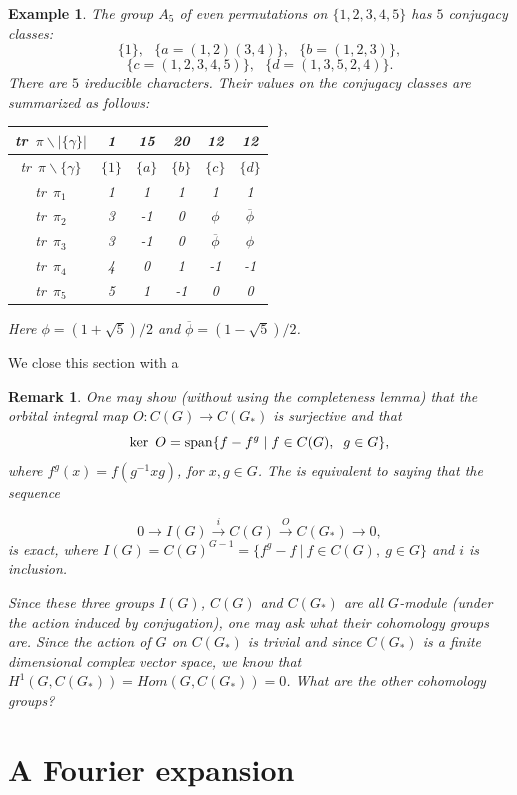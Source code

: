 \documentclass[12pt]{article}
\newtheorem{example}[theorem]{Example}
\newtheorem{remark}{Remark}
\begin{document}
\begin{example}
The group $A_5$ of even permutations on $\{1,2,3,4,5\}$
has $5$ conjugacy classes:
\[
\{1\},\ \ \ \{a=(1,2)(3,4)\},\ \ \ \{b=(1,2,3)\},
\]
\[
\{c=(1,2,3,4,5)\},\ \ \ 
\{d=(1,3,5,2,4)\}.
\]
There are $5$ ireducible characters.
Their values on the conjugacy classes are summarized as follows:
\begin{center}
\begin{tabular}{|c|c|c|c|c|c|} \hline
tr\ $\pi\backslash |\{\gamma\}|$& 1 & 15 & 20 & 12 & 12 \\ \hline
tr\ $\pi\backslash \{\gamma\}$& $\{1\}$ & $\{a \}$ & $\{b \}$ & $\{ c\}$ & $\{ d\}$ \\ \hline
tr\ $\pi _1$ & 1 & 1 & 1 & 1 & 1\\ 
tr\ $\pi _2$ & 3 & -1 & 0 & $\phi$ & $\overline{\phi}$ \\ 
tr\ $\pi _3$ & 3 & -1 & 0 & $\overline{\phi}$ & $\phi$ \\
tr\ $\pi _4$ & 4 & 0 & 1 & -1 & -1 \\ 
tr\ $\pi _5$ & 5 & 1 & -1 & 0 & 0 \\ \hline
\end{tabular}
\end{center}
Here $\phi=(1+\sqrt{5})/2$ and $\overline{\phi}=(1-\sqrt{5})/2$.
\end{example}

We close this section with a

\begin{remark}
One may show (without using the completeness lemma) that the orbital 
integral map $O:C(G)\rightarrow C(G_{*})$ is surjective and that
\[
\ker \medskip\ O=\mathrm{span}\{f-f^g\;|\;f\in C(G),\;\;g\in G\},
\]
where $f^g(x)=f(g^{-1}xg)$, for $x,g\in G$.
The is equivalent to saying that the sequence

\[
0\rightarrow I(G)\stackrel{i}{\rightarrow} C(G)\stackrel{O}{\rightarrow} C(G_*)\rightarrow 0,
\]
is exact, where $I(G)=C(G)^{G-1}=\{f^g-f\ |\ f\in C(G),\ g\in G\}$
and $i$ is inclusion. 

Since these three groups $I(G)$, $C(G)$ and $C(G_*)$ are all $G$-module
(under the action induced by conjugation), one may ask what their
cohomology groups are. Since the action of $G$ on $C(G_*)$ is trivial and
since $C(G_*)$ is a finite dimensional complex vector space, we know that
$H^1(G,C(G_*))=Hom(G,C(G_*))=0$. What are the other cohomology groups?
\end{remark}

\section{A Fourier expansion}
\end{document}

